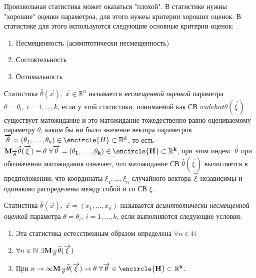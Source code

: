 Произвольная статистика может оказаться "плохой". В статистике
нужны "хорошие" оценки параметроа, для этого нужеы критерии хороших оценок.
В статистике для этого используются следующие основные критерии оценок:
\begin{enumerate}
    \item Несмещенность (асимптотически несмещенность)
    \item Состоятельность
    \item Оптимальность
\end{enumerate}

\begin{defs}[Несмещенность]
  Статистика $\widehat{\theta}(\overrightarrow{x}), \ \overrightarrow{x} \in \mathbb{R}^n$
  называется \textit{несмещенной оценкой} параметра $\theta=\theta_i, \ i=1,\ldots,k$, если у
  этой статистики, понимаемой как СВ $widehat{\theta}(\overrightarrow{\xi})$ существует матожидание
  и это матожидание тожедественно равно оцениваемому параметру $\theta$, каким бы ни было значение вектора
  параметров $\overrightarrow{\theta} = (\theta_1,\ldots,\theta_k) \in \encircle{H} \subset \mathbb{R}^k$, то есть
  $\bf{M}_{\overrightarrow{\theta}}\widehat{\theta}(\overrightarrow{\xi})\equiv\theta \
  \forall \overrightarrow{\theta} = (\theta_1,\ldots,\theta_k) \in \encircle{H} \subset \mathbb{R}^k$, при этом
  индекс $\overrightarrow{\theta}$ при обозначении матожидания означает, что матожидание СВ
  $\widehat{\theta}(\overrightarrow{\xi})$ вычисляется в предположении, что координаты $\xi_1,\ldots,\xi_n$
  случайного вектора $\overrightarrow{\xi}$ независимы и одинаково распределены между собой и со СВ $\xi$.
\end{defs}

\begin{defs}
  Статистика $\widehat{\theta}(\overrightarrow{x}), \ \overrightarrow{x}=(x_1,\ldots,x_n)$ называется
  \textit{асимптотически несмещенной оценкой} параметра $\theta = \theta_i, \ i=1,\ldots,k$, если выполняются
  следующие условия:
  \begin{enumerate}
      \item Эта статистика естесственным образом определена $\forall n \in \mathbb{N}$
      \item $\forall n \in \mathbb{N} \ \exists \bf{M}_{\overrightarrow{\theta}}\widehat{\theta}(\overrightarrow{\xi})$
      \item При $n \to \infty \bf{M}_{\overrightarrow{\theta}}\widehat{\theta}(\overrightarrow{\xi}) \to \theta \
      \forall \overrightarrow{\theta} \in \encircle{H} \subset \mathbb{R}^k$.
  \end{enumerate}
\end{defs}

